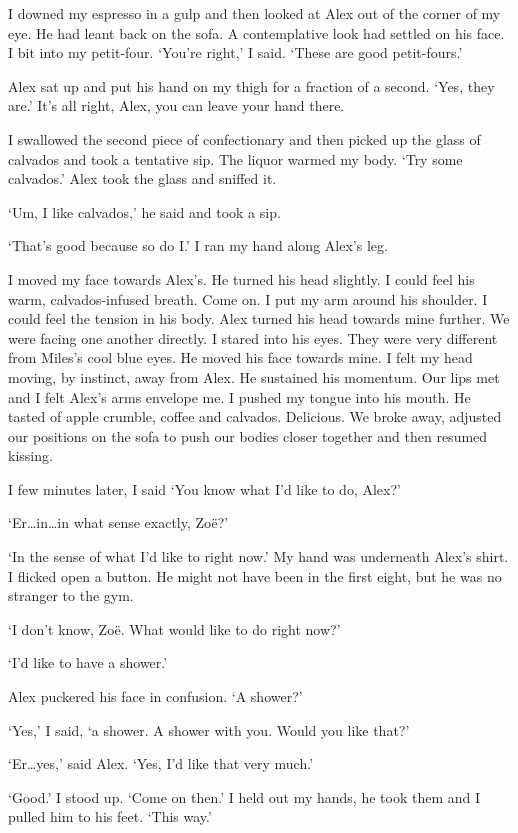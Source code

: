 I downed my espresso in a gulp and then looked at Alex out of the
corner of my eye. He had leant back on the sofa. A contemplative
look had settled on his face. I bit into my petit-four. `You're right,' I said. `These are
good petit-fours.'

Alex sat up and put his hand on my thigh for a fraction of a second.
`Yes, they are.' It's all right, Alex, you can leave your hand
there.

I swallowed the second piece of confectionary and then picked up the
glass of calvados and took a tentative sip. The liquor warmed my
body. `Try some calvados.' Alex took the glass and sniffed it.

`Um, I like calvados,' he said and took a sip.

`That's good because so do I.' I ran my hand along Alex's leg.

I moved my face towards Alex's. He turned his head slightly. I could
feel his warm, calvados-infused breath. Come on. I put my arm around
his shoulder. I could feel the tension in his body. Alex turned his
head towards mine further. We were facing one another directly. I
stared into his eyes. They were very different from Miles's cool
blue eyes. He moved his face towards mine. I felt my head moving, by
instinct, away from Alex. He sustained his momentum. Our lips met
and I felt Alex's arms envelope me. I pushed my tongue into his
mouth. He tasted of apple crumble, coffee and calvados. Delicious.
We broke away, adjusted our positions on the sofa to push our bodies
closer together and then resumed kissing.

I few minutes later, I said `You know what I'd like to do, Alex?'

`Er\dots in\dots in what sense exactly, Zo{\"e}?'

`In the sense of what I'd like to right now.' My hand was underneath
Alex's shirt. I flicked open a button. He might not have been in the
first eight, but he was no stranger to the gym.

`I don't know, Zo{\"e}. What would like to do right now?'

`I'd like to have a shower.'

Alex puckered his face in confusion. `A shower?'

`Yes,' I said, `a shower. A shower with you. Would you like that?'

`Er\dots yes,' said Alex. `Yes, I'd like that very much.'

`Good.' I stood up. `Come on then.' I held out my hands, he took
them and I pulled him to his feet. `This way.'

